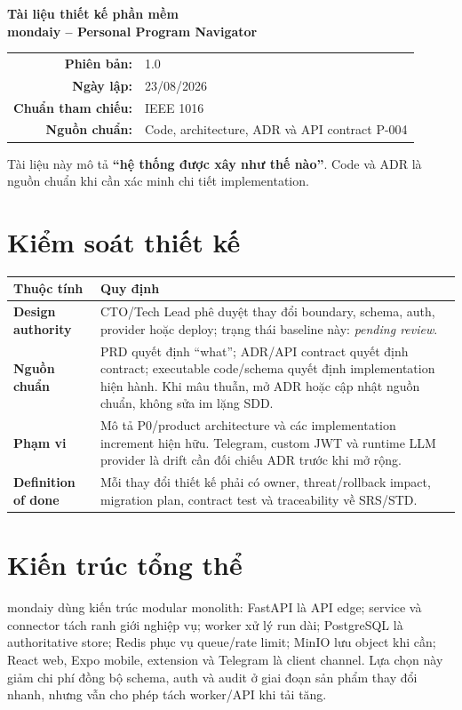 \documentclass[11pt,a4paper]{article}
\begin{document}
\begin{titlepage}\centering\vspace*{2.4cm}
{\Huge\bfseries\color{mondaiyblue} Tài liệu thiết kế phần mềm\\[0.2cm]mondaiy -- Personal Program Navigator\par}
\vspace{0.9cm}{\Large Software Design Document (SDD)\par}\vfill
\begin{tabular}{rl}\textbf{Phiên bản:} & 1.0 \\ \textbf{Ngày lập:} & 23/08/2026 \\ \textbf{Chuẩn tham chiếu:} & IEEE 1016 \\ \textbf{Nguồn chuẩn:} & Code, architecture, ADR và API contract P-004 \\ \end{tabular}\vfill
\colorbox{mondaiylight}{\parbox{0.86\textwidth}{Tài liệu này mô tả \textbf{``hệ thống được xây như thế nào''}. Code và ADR là nguồn chuẩn khi cần xác minh chi tiết implementation.}}
\end{titlepage}
\tableofcontents\clearpage

\section{Kiểm soát thiết kế}
\begin{tabularx}{\textwidth}{>{\bfseries}p{3.2cm}X}
\toprule Thuộc tính & Quy định \\ \midrule
Design authority & CTO/Tech Lead phê duyệt thay đổi boundary, schema, auth, provider hoặc deploy; trạng thái baseline này: \emph{pending review}. \\
Nguồn chuẩn & PRD quyết định ``what''; ADR/API contract quyết định contract; executable code/schema quyết định implementation hiện hành. Khi mâu thuẫn, mở ADR hoặc cập nhật nguồn chuẩn, không sửa im lặng SDD. \\
Phạm vi & Mô tả P0/product architecture và các implementation increment hiện hữu. Telegram, custom JWT và runtime LLM provider là drift cần đối chiếu ADR trước khi mở rộng. \\
Definition of done & Mỗi thay đổi thiết kế phải có owner, threat/rollback impact, migration plan, contract test và traceability về SRS/STD. \\
\bottomrule
\end{tabularx}

\section{Kiến trúc tổng thể}
mondaiy dùng kiến trúc modular monolith: FastAPI là API edge; service và connector tách ranh giới nghiệp vụ; worker xử lý run dài; PostgreSQL là authoritative store; Redis phục vụ queue/rate limit; MinIO lưu object khi cần; React web, Expo mobile, extension và Telegram là client channel. Lựa chọn này giảm chi phí đồng bộ schema, auth và audit ở giai đoạn sản phẩm thay đổi nhanh, nhưng vẫn cho phép tách worker/API khi tải tăng.
\end{document}
